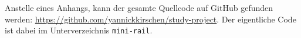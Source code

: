 
\label{appendix}

Anstelle eines Anhangs, kann der gesamte Quellcode auf GitHub gefunden werden: \href{https://github.com/yannickkirschen/study-project}{https://github.com/yannickkirschen/study-project}. Der eigentliche Code ist dabei im Unterverzeichnis \texttt{mini-rail}.
